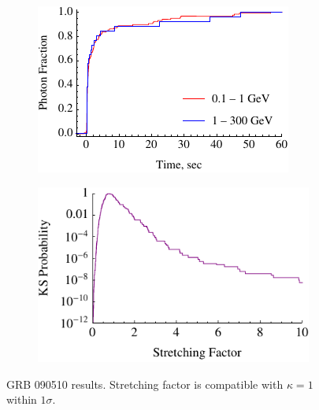 \documentclass{article}
\begin{document}
\begin{figure}
        \centering
        \begin{subfigure}{0.49\textwidth}
                \includegraphics[width=\textwidth]{lightCurve090510}
                \label{fig:lightCurve090510}
        \end{subfigure}
        \begin{subfigure}{0.49\textwidth}
                \includegraphics[width=\textwidth]{probabilities090510}
                \label{fig:probabilities090510}
        \end{subfigure}
        \caption{GRB 090510 results. Stretching factor is compatible with $\kappa = 1$ within $1\sigma$.}
        \label{fig:grb090510}
\end{figure}
\end{document}
